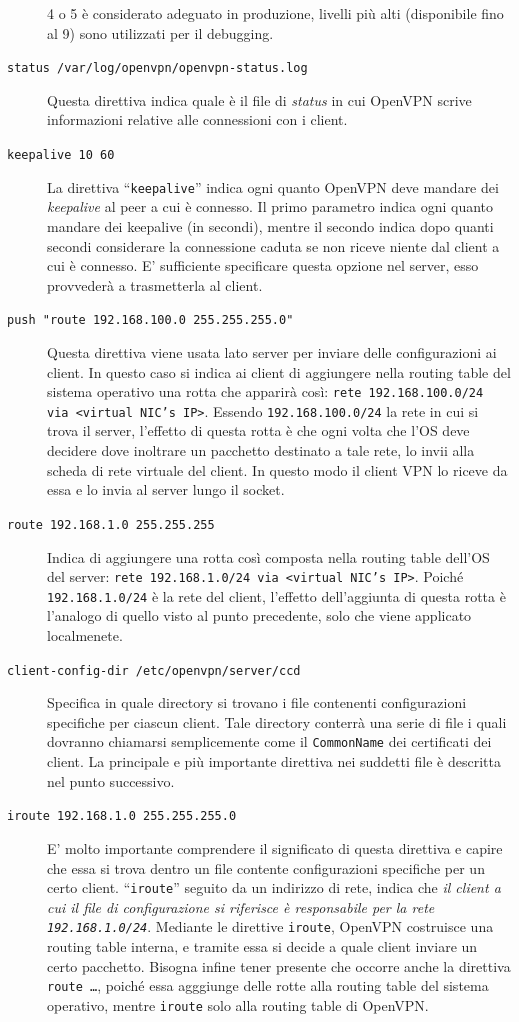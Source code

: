 \begin{description}
	4 o 5 è considerato adeguato in produzione, livelli più alti (disponibile fino al 9)
	sono utilizzati per il debugging.
	\item[\texttt{status /var/log/openvpn/openvpn-status.log}]Questa direttiva indica
	quale è il file di \textit{status} in cui OpenVPN scrive informazioni relative
	alle connessioni con i client.
	\item[\texttt{keepalive 10 60}]La direttiva ``\texttt{keepalive}'' indica ogni
	quanto OpenVPN deve mandare dei \textit{keepalive} al peer a cui è connesso.
	Il primo parametro indica ogni quanto mandare dei keepalive (in secondi), mentre
	il secondo indica dopo quanti secondi considerare la connessione caduta se non riceve
	niente dal client a cui è connesso. E' sufficiente specificare questa opzione
	nel server, esso provvederà a trasmetterla al client.
	\item[\texttt{push "route 192.168.100.0 255.255.255.0"}]Questa direttiva viene
	usata lato server per inviare delle configurazioni ai client. In questo caso si indica
	ai client di aggiungere nella routing table del sistema operativo una rotta che
	apparirà così: \texttt{rete 192.168.100.0/24 via <virtual NIC's IP>}. Essendo
	\texttt{192.168.100.0/24} la rete in cui si trova il server, l'effetto di questa
	rotta è che ogni volta che l'OS deve decidere dove inoltrare un
	pacchetto destinato a tale rete, lo invii alla scheda di rete virtuale
	del client. In questo modo il client VPN lo riceve da essa e lo invia al server
	lungo il socket.
	\item[\texttt{route 192.168.1.0 255.255.255}]Indica di aggiungere una rotta
	così composta nella routing table dell'OS del server: \texttt{rete 192.168.1.0/24
		via <virtual NIC's IP>}. Poiché \texttt{192.168.1.0/24} è la rete del client, l'effetto
	dell'aggiunta di questa rotta è l'analogo di quello visto al punto precedente, solo che
	viene applicato localmenete.
	\item[\texttt{client-config-dir /etc/openvpn/server/ccd}]Specifica in quale
	directory si trovano i file contenenti configurazioni specifiche per ciascun client.
	Tale directory conterrà una serie di file i quali dovranno chiamarsi semplicemente
	come il \texttt{CommonName} dei certificati dei client. La principale e più
	importante direttiva nei suddetti file è descritta nel punto successivo.
	\item[\texttt{iroute 192.168.1.0 255.255.255.0}]E' molto importante comprendere
	il significato di questa direttiva e capire che essa si trova dentro un file
	contente configurazioni specifiche per un certo client. ``\texttt{iroute}'' seguito
	da un indirizzo di rete, indica che \textit{il client a cui il file di configurazione
		si riferisce è responsabile per la rete \texttt{192.168.1.0/24}}. Mediante le
	direttive \texttt{iroute}, OpenVPN costruisce una routing table interna,
	e tramite essa si
	decide a quale client inviare un certo pacchetto. Bisogna infine tener presente
	che occorre anche la direttiva \texttt{route \ldots}, poiché essa agggiunge delle
	rotte alla routing table del sistema operativo, mentre \texttt{iroute} solo
	alla routing table di OpenVPN.
\end{description}

